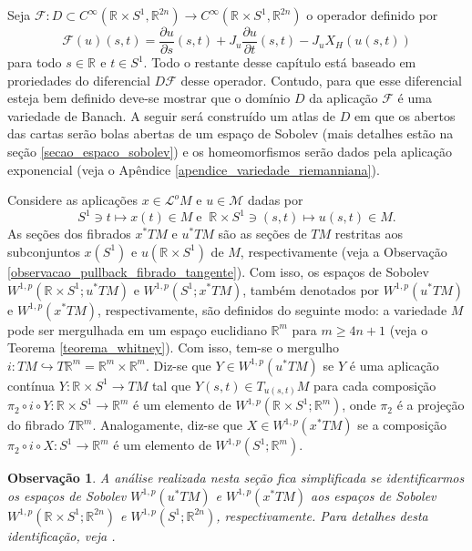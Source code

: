 \documentclass[12pt]{book}
\newtheorem{observacao}[teorema]{Observação}
\newcommand{\aplicaoessuaves}[2]{C^{\infty}(#1, #2)}
\newcommand{\circulo}{S^{1}}
\newcommand{\diferencialfloer}{D\operadorFloer}
\newcommand{\derivadaparcial}[2]{\frac{\partial #1}{\partial #2}}
\newcommand{\energiafinitaM}{\mathcal{M}}
\newcommand{\espacosobolev}[1]{W^{1,p}(#1)}
\newcommand{\espacosobolevcontradominio}[2]{W^{1,p}(#1;#2)}
\newcommand{\espacotangenteponto}[2]{T_{#1}#2}
\newcommand{\operadorFloer}{\mathcal{F}}
\newcommand{\operadorFloerDefParametros}[1]{\derivadaparcial{#1}{s}(s,t) + J_{#1}\derivadaparcial{#1}{t}(s,t) - J_{#1}X_{H}(#1(s,t))}
\newcommand{\operadorFloerParametro}[1]{\mathcal{F}(#1)}
\newcommand{\pullbackfibradotangente}[2]{#1^{*}T#2}
\newcommand{\pullbackfibradotangenteM}[1]{\pullbackfibradotangente{#1}{M}}
\newcommand{\retacartesianocirculo}{\real{} \times \circulo}
\newcommand{\real}[1]{\mathbb{R}^{#1}}
\newcommand{\reta}{\real{}}
\newcommand{\lacocontrateis}{\mathcal{L}^{o}M}
\begin{document}
	Seja $\operadorFloer:D \subset \aplicaoessuaves{\retacartesianocirculo}{\real{2n}}\to \aplicaoessuaves{\retacartesianocirculo}{\real{2n}}$ o operador definido por 
	$$
	\operadorFloerParametro{u}(s,t)=\operadorFloerDefParametros{u}
	$$
	para todo $s\in \reta$ e $t\in \circulo$. Todo o restante desse capítulo está baseado em proriedades do diferencial $\diferencialfloer$ desse operador. Contudo, para que esse diferencial esteja bem definido deve-se mostrar que o domínio $D$ da aplicação $\operadorFloer$ é uma variedade de Banach. A seguir será construído um atlas de $D$ em que os abertos das cartas serão bolas abertas de um espaço de Sobolev (mais detalhes estão na seção \ref{secao_espaco_sobolev}) e os homeomorfismos serão dados pela aplicação exponencial (veja o Apêndice \ref{apendice_variedade_riemanniana}).
	
	Considere as aplicações $x\in\lacocontrateis$ e $u \in \energiafinitaM$ dadas por
	$$
	\circulo \ni t \mapsto x(t) \in M\; \text{e}\;\;\retacartesianocirculo \ni (s,t)\mapsto u(s,t) \in M.
	$$ 
	As seções dos fibrados $\pullbackfibradotangenteM{x}$ e $\pullbackfibradotangenteM{u}$ são as seções de $TM$ restritas aos subconjuntos $x(\circulo )$ e  $u(\retacartesianocirculo )$ de $M$, respectivamente (veja a Observação \ref{observacao_pullback_fibrado_tangente}). Com isso, os espaços de Sobolev $\espacosobolevcontradominio{\retacartesianocirculo}{\pullbackfibradotangenteM{u}}$ e $\espacosobolevcontradominio{\circulo}{\pullbackfibradotangenteM{x}}$, também denotados por  $\espacosobolev{\pullbackfibradotangenteM{u}}$ e $\espacosobolev{\pullbackfibradotangenteM{x}}$, respectivamente, são definidos do seguinte modo: a variedade $M$ pode ser mergulhada em um espaço euclidiano $\real{m}$ para $m\geq 4n+1$ (veja o Teorema \ref{teorema_whitney}). Com isso, tem-se o mergulho $i:TM \hookrightarrow T\real{m} = \real{m} \times \real{m}$. Diz-se que $Y\in \espacosobolev{\pullbackfibradotangenteM{u}}$ se $Y$ é uma aplicação contínua $Y:\retacartesianocirculo\to TM$ tal que $Y(s,t)\in \espacotangenteponto{u(s,t)}{M}$ para cada composição $\pi_{2}\circ i\circ Y:\retacartesianocirculo\to \real{m}$ é um elemento de $\espacosobolevcontradominio{\retacartesianocirculo}{\real{m}}$, onde $\pi_{2}$ é a projeção do fibrado $T\real{m}$. Analogamente, diz-se que $X \in \espacosobolev{\pullbackfibradotangenteM{x}}$ se a composição $\pi_{2}\circ i\circ X:\circulo \to \real{m}$ é um elemento de $\espacosobolevcontradominio{\circulo}{\real{m}}$.
	
	\begin{observacao}
		A análise realizada nesta seção fica simplificada se identificarmos os espaços de Sobolev $\espacosobolev{\pullbackfibradotangenteM{u}}$ e $\espacosobolev{\pullbackfibradotangenteM{x}}$ aos espaços de Sobolev $\espacosobolevcontradominio{\retacartesianocirculo}{\real{2n}}$ e  $\espacosobolevcontradominio{\circulo}{\real{2n}}$, respectivamente. Para detalhes desta identificação, veja \cite{audi_floer_homology}.
	\end{observacao}
	
\end{document}
